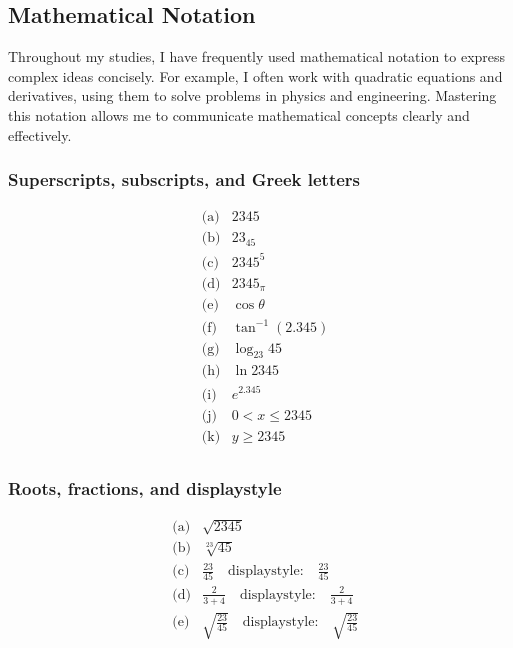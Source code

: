 \documentclass{article}
\begin{document}
\subsection{Mathematical Notation}
Throughout my studies, I have frequently used mathematical notation to express complex ideas concisely. For example, I often work with quadratic equations and derivatives, using them to solve problems in physics and engineering. Mastering this notation allows me to communicate mathematical concepts clearly and effectively.


\subsubsection{Superscripts, subscripts, and Greek letters}
\begin{align*}
    &\text{(a)} & 2345 \\
    &\text{(b)} & 23_{45} \\
    &\text{(c)} & 2345^{5} \\
    &\text{(d)} & 2345_{\pi} \\
    &\text{(e)} & \cos \theta \\
    &\text{(f)} & \tan^{-1}(2.345) \\
    &\text{(g)} & \log_{23} 45 \\
    &\text{(h)} & \ln 2345 \\
    &\text{(i)} & e^{2.345} \\
    &\text{(j)} & 0 < x \leq 2345 \\
    &\text{(k)} & y \geq 2345 \\
\end{align*}

\subsubsection{Roots, fractions, and displaystyle}
\begin{align*}
    &\text{(a)} & \sqrt{2345} \\
    &\text{(b)} & \sqrt[23]{45} \\
    &\text{(c)} & \frac{23}{45} \quad \text{displaystyle:} \quad \frac{\displaystyle 23}{\displaystyle 45} \\
    &\text{(d)} & \frac{2}{3 + 4} \quad \text{displaystyle:} \quad \frac{\displaystyle 2}{\displaystyle 3 + 4} \\
    &\text{(e)} & \sqrt{\frac{23}{45}} \quad \text{displaystyle:} \quad \sqrt{\frac{\displaystyle 23}{\displaystyle 45}} \\
\end{align*}
\end{document}
